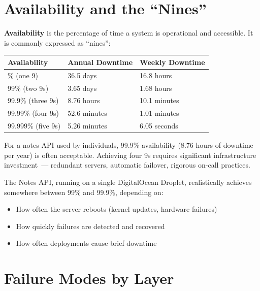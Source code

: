\setcounter{section}{0}
\section{Availability and the ``Nines''}\label{37-reliability:371-availability-and-the-nines}

\textbf{Availability} is the percentage of time a system is operational and accessible. It is commonly expressed as ``nines'':


{\def\LTcaptype{none} %
\begin{longtable}[]{@{}lll@{}}
\toprule\noalign{}
Availability & Annual Downtime & Weekly Downtime \\
\midrule\noalign{}
\endhead
\bottomrule\noalign{}
\endlastfoot
90\% (one 9) & 36.5 days & 16.8 hours \\
99\% (two 9s) & 3.65 days & 1.68 hours \\
99.9\% (three 9s) & 8.76 hours & 10.1 minutes \\
99.99\% (four 9s) & 52.6 minutes & 1.01 minutes \\
99.999\% (five 9s) & 5.26 minutes & 6.05 seconds \\
\end{longtable}
}

For a notes API used by individuals, 99.9\% availability (8.76 hours of downtime per year) is often acceptable. Achieving four 9s requires significant infrastructure investment~--- redundant servers, automatic failover, rigorous on-call practices.

The Notes API, running on a single DigitalOcean Droplet, realistically achieves somewhere between 99\% and 99.9\%, depending on:

\begin{itemize}
\tightlist
\item
  How often the server reboots (kernel updates, hardware failures)
\item
  How quickly failures are detected and recovered
\item
  How often deployments cause brief downtime
\end{itemize}

\setcounter{section}{1}
\section{Failure Modes by Layer}\label{37-reliability:372-failure-modes-by-layer}

